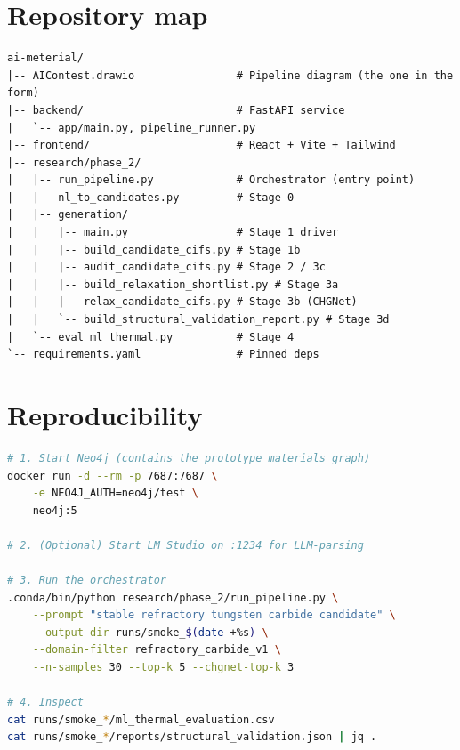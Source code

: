 \documentclass[11pt,a4paper]{report}
\begin{document}
\chapter{Repository map}
\begin{lstlisting}[language={},caption={Top-level repo layout.},label={lst:tree}]
ai-meterial/
|-- AIContest.drawio                # Pipeline diagram (the one in the form)
|-- backend/                        # FastAPI service
|   `-- app/main.py, pipeline_runner.py
|-- frontend/                       # React + Vite + Tailwind
|-- research/phase_2/
|   |-- run_pipeline.py             # Orchestrator (entry point)
|   |-- nl_to_candidates.py         # Stage 0
|   |-- generation/
|   |   |-- main.py                 # Stage 1 driver
|   |   |-- build_candidate_cifs.py # Stage 1b
|   |   |-- audit_candidate_cifs.py # Stage 2 / 3c
|   |   |-- build_relaxation_shortlist.py # Stage 3a
|   |   |-- relax_candidate_cifs.py # Stage 3b (CHGNet)
|   |   `-- build_structural_validation_report.py # Stage 3d
|   `-- eval_ml_thermal.py          # Stage 4
`-- requirements.yaml               # Pinned deps
\end{lstlisting}

\chapter{Reproducibility}

\begin{lstlisting}[language=bash,caption={Reproducing a run from scratch.},label={lst:repro}]
# 1. Start Neo4j (contains the prototype materials graph)
docker run -d --rm -p 7687:7687 \
    -e NEO4J_AUTH=neo4j/test \
    neo4j:5

# 2. (Optional) Start LM Studio on :1234 for LLM-parsing

# 3. Run the orchestrator
.conda/bin/python research/phase_2/run_pipeline.py \
    --prompt "stable refractory tungsten carbide candidate" \
    --output-dir runs/smoke_$(date +%s) \
    --domain-filter refractory_carbide_v1 \
    --n-samples 30 --top-k 5 --chgnet-top-k 3

# 4. Inspect
cat runs/smoke_*/ml_thermal_evaluation.csv
cat runs/smoke_*/reports/structural_validation.json | jq .
\end{lstlisting}
\end{document}
